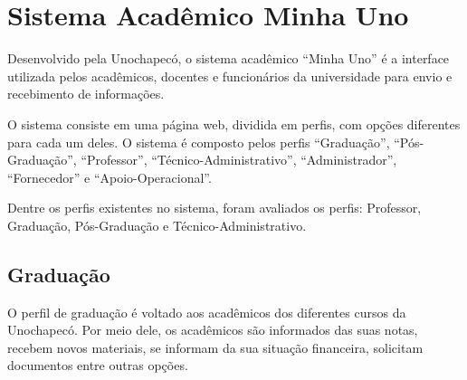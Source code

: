 \chapter{Sistema Acadêmico Minha Uno}

Desenvolvido pela Unochapecó, o sistema acadêmico “Minha Uno'' é a interface utilizada pelos acadêmicos, docentes e funcionários da universidade para envio e recebimento de informações.

O sistema consiste em uma página web, dividida em perfis, com opções diferentes para cada um deles. O sistema é composto pelos perfis “Graduação'', “Pós-Graduação'', “Professor'', “Técnico-Administrativo'', “Administrador'', “Fornecedor'' e “Apoio-Operacional''.

Dentre os perfis existentes no sistema, foram avaliados os perfis: Professor, Graduação, Pós-Graduação e Técnico-Administrativo.


\section{Graduação}
O perfil de graduação é voltado aos acadêmicos dos diferentes cursos da Unochapecó. Por meio dele, 
os acadêmicos são informados das  suas notas, recebem novos materiais, 
se informam da sua situação financeira, solicitam documentos entre outras opções.

